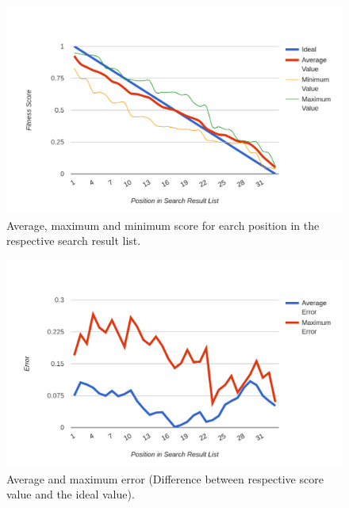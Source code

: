 \begin{figure}[H]
    \centering
    \includegraphics[width=\textwidth]{images/dist_avg.png}
    \caption[Average Scores]{Average, maximum and minimum score for earch position in the respective search result list.}
    \label{fig:dist-avg}
\end{figure}

\begin{figure}[H]
    \centering
    \includegraphics[width=\textwidth]{images/dist_error.png}
    \caption[Score Errors]{Average and maximum error (Difference between respective score value and the ideal value).}
    \label{fig:dist-err}
\end{figure}

